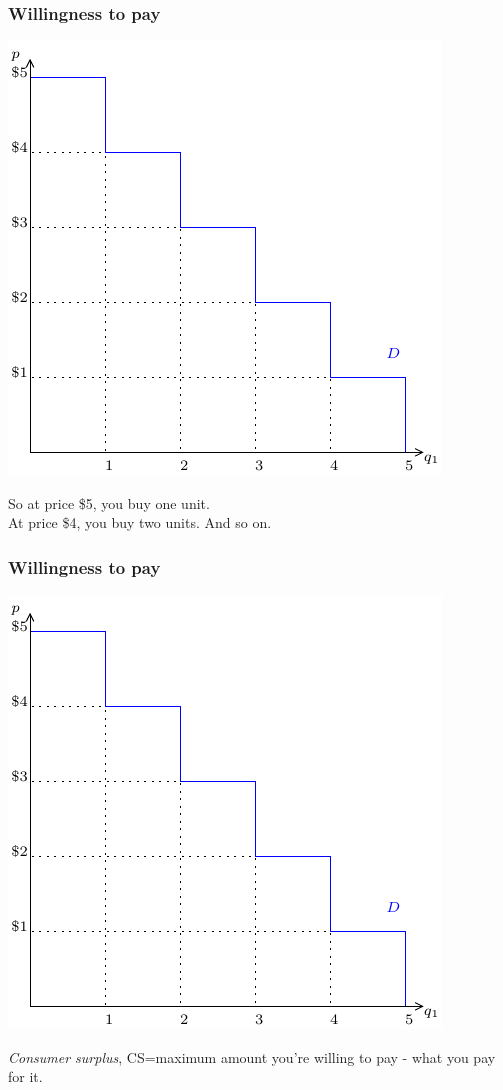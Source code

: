\documentclass[xcolor=pdftex,dvipsnames]{beamer}
\begin{document}
\begin{frame}
\frametitle{Willingness to pay}
\begin{center}
\includegraphics[scale=0.9]{pics/ConsumerWelfare1}
\end{center}
So at price \$5, you buy one unit.\\
At price \$4, you buy two units. And so on.
\end{frame}




\begin{frame}
\frametitle{Willingness to pay}
\begin{center}
\includegraphics[scale=0.9]{pics/ConsumerWelfare1}
\end{center}
\emph{Consumer surplus}, CS=maximum amount you're willing to pay -
what you pay for it.

\end{frame}
\end{document}
